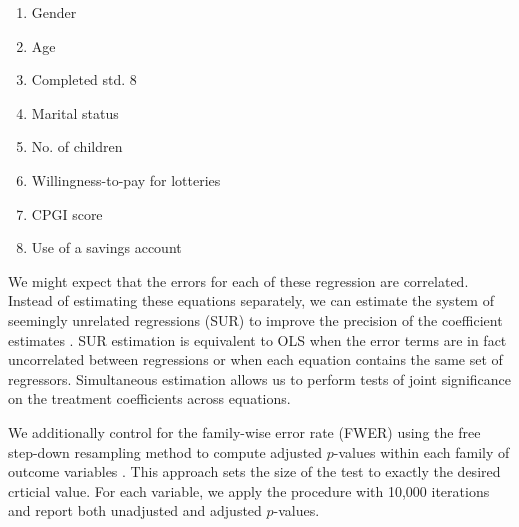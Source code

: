 \documentclass[10pt]{article}
\begin{document}
		\begin{enumerate}
			\item Gender
			\item Age
			\item Completed std. 8
			\item Marital status
			\item No. of children
			\item Willingness-to-pay for lotteries
			\item CPGI score
			\item Use of a savings account
		\end{enumerate}

		We might expect that the errors for each of these regression are correlated. Instead of estimating these equations separately, we can estimate the system of seemingly unrelated regressions (SUR) to improve the precision of the coefficient estimates . SUR estimation is equivalent to OLS when the error terms are in fact uncorrelated between regressions or when each equation contains the same set of regressors. Simultaneous estimation allows us to perform tests of joint significance on the treatment coefficients across equations.

		We additionally control for the family-wise error rate (FWER) using the free step-down resampling method to compute adjusted $p$-values within each family of outcome variables . This approach sets the size of the test to exactly the desired crticial value. For each variable, we apply the procedure with 10,000 iterations and report both unadjusted and adjusted $p$-values.
\end{document}
